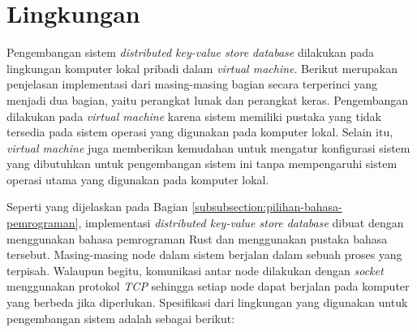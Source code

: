 \section{Lingkungan}
\label{sec:environment}

Pengembangan sistem \textit{distributed key-value store database} dilakukan pada lingkungan komputer lokal pribadi dalam \textit{virtual machine}. Berikut merupakan penjelasan implementasi dari masing-masing bagian secara terperinci yang menjadi dua bagian, yaitu perangkat lunak dan perangkat keras. Pengembangan dilakukan pada \textit{virtual machine} karena sistem memiliki pustaka yang tidak tersedia pada sistem operasi yang digunakan pada komputer lokal. Selain itu, \textit{virtual machine} juga memberikan kemudahan untuk mengatur konfigurasi sistem yang dibutuhkan untuk pengembangan sistem ini tanpa mempengaruhi sistem operasi utama yang digunakan pada komputer lokal.

Seperti yang dijelaskan pada Bagian \ref{subsubsection:pilihan-bahasa-pemrograman}, implementasi \textit{distributed key-value store database} dibuat dengan menggunakan bahasa pemrograman Rust dan menggunakan pustaka bahasa tersebut. Masing-masing node dalam sistem berjalan dalam sebuah proses yang terpisah. Walaupun begitu, komunikasi antar node dilakukan dengan \textit{socket} menggunakan protokol \textit{TCP} sehingga setiap node dapat berjalan pada komputer yang berbeda jika diperlukan. Spesifikasi dari lingkungan yang digunakan untuk pengembangan sistem adalah sebagai berikut:


